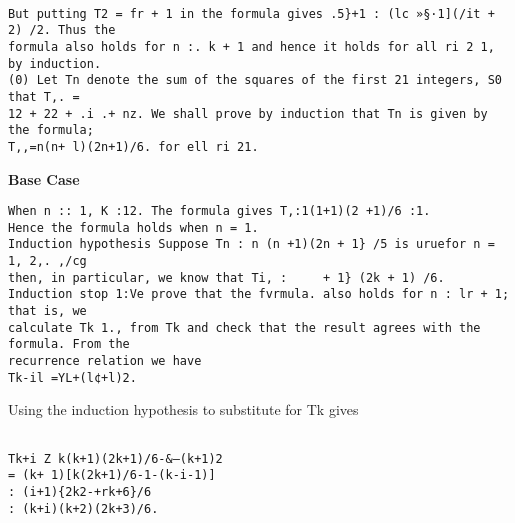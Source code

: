 \documentclass[]{article}
\begin{document}
\begin{verbatim}

But putting T2 = fr + 1 in the formula gives .5}+1 : (lc »§·1](/it + 2) /2. Thus the
formula also holds for n :. k + 1 and hence it holds for all ri 2 1, by induction.
(0) Let Tn denote the sum of the squares of the first 21 integers, S0 that T,. =
12 + 22 + .i .+ nz. We shall prove by induction that Tn is given by the formula;
T,,=n(n+ l)(2n+1)/6. for ell ri 21.
\end{verbatim}
\textbf{Base Case}
\begin{verbatim}
When n :: 1, K :12. The formula gives T,:1(1+1)(2 +1)/6 :1.
Hence the formula holds when n = 1.
Induction hypothesis Suppose Tn : n (n +1)(2n + 1} /5 is uruefor n = 1, 2,. ,/cg
then, in particular, we know that Ti, :     + 1} (2k + 1) /6.
Induction stop 1:Ve prove that the fvrmula. also holds for n : lr + 1; that is, we
calculate Tk 1., from Tk and check that the result agrees with the formula. From the
recurrence relation we have
Tk-il =YL+(l¢+l)2.
\end{verbatim}
Using the induction hypothesis to substitute for Tk gives
\begin{verbatim}

Tk+i Z k(k+1)(2k+1)/6-&—(k+1)2
= (k+ 1)[k(2k+1)/6-1-(k-i-1)]
: (i+1){2k2-+rk+6}/6
: (k+i)(k+2)(2k+3)/6.
\end{verbatim}
\end{document}
